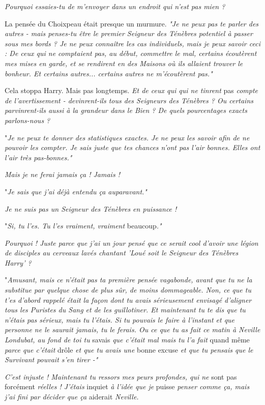 \emph{Pourquoi essaies-tu de m'envoyer dans un endroit qui n'est pas mien ?} 

La pensée du Choixpeau était presque un murmure. \emph{"Je ne peux pas te parler des autres - mais penses-tu être le premier Seigneur des Ténèbres potentiel à passer sous mes bords ? Je ne peux connaître les cas individuels, mais je peux savoir ceci : De ceux qui ne comptaient pas, au début, commettre le mal, certains écoutèrent mes mises en garde, et se rendirent en des Maisons où ils allaient trouver le bonheur. Et certains autres... certains autres ne m'écoutèrent pas."} 

Cela stoppa Harry. Mais pas longtemps. \emph{Et de ceux qui qui ne tinrent } pas\emph{ compte de l'avertissement - devinrent-ils tous des Seigneurs des Ténèbres ? Ou certains parvinrent-ils aussi à la grandeur dans le Bien ? De quels pourcentages exacts parlons-nous ?} 

"\emph{Je ne peux te donner des statistiques exactes. Je ne peux les savoir afin de ne pouvoir les compter. Je sais juste que tes chances n'ont pas l'air bonnes. Elles ont l'air très pas-bonnes."} 

\emph{Mais je ne ferai jamais ça ! Jamais !} 

"\emph{Je sais que j'ai déjà entendu ça auparavant."} 

\emph{Je ne suis pas un Seigneur des Ténèbres en puissance !} 

"\emph{Si, tu l'es. Tu l'es vraiment, vraiment}  beaucoup\emph{."} 

\emph{Pourquoi ! Juste parce que j'ai un jour pensé que ce serait cool d'avoir une légion de disciples au cerveaux lavés chantant 'Loué soit le Seigneur des Ténèbres Harry' ?} 

"\emph{Amusant, mais ce n'était pas ta première pensée vagabonde, avant que tu ne la substitue par quelque chose de plus sûr, de moins dommageable. Non, ce que tu t'es d'abord rappelé était la façon dont tu avais sérieusement envisagé d'aligner tous les Puristes du Sang et de les guillotiner. Et maintenant tu te dis que tu n'étais pas sérieux, mais tu l'étais. Si tu pouvais le faire à l'instant et que personne ne le saurait jamais, tu le ferais. Ou ce que tu as fait ce matin à Neville Londubat, au fond de toi tu } savais\emph{ que c'était mal mais tu l'a fait } quand même\emph{ parce que c'était } drôle\emph{ et que tu avais une } bonne excuse\emph{ et que tu pensais que le Survivant pouvait s'en tirer -"} 

\emph{C'est injuste ! Maintenant tu ressors mes peurs profondes, qui ne } sont pas forcément \emph{réelles ! J'étais } inquiet\emph{ à l'idée que je } puisse\emph{ penser comme ça, mais j'ai fini par décider que ça } aiderait\emph{ Neville.} 

